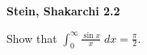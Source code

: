 \textbf{Stein, Shakarchi 2.2}

Show that $ \int_{0}^{\infty}{\frac{\sin x}{x} \; dx} = \frac{\pi}{2}.$

\begin{solution}
    \ \\
\end{solution}